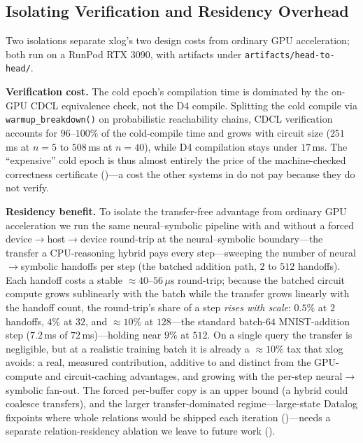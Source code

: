 \subsection{Isolating Verification and Residency Overhead}\label{sec:overhead}

Two isolations separate xlog's two design costs from ordinary GPU acceleration; both run on a RunPod RTX 3090, with artifacts under \texttt{artifacts/head-to-head/}.

\textbf{Verification cost.} The cold epoch's compilation time is dominated by the on-GPU CDCL equivalence check, not the D4 compile. Splitting the cold compile via \texttt{warmup\_breakdown()} on probabilistic reachability chains, CDCL verification accounts for $96$--$100\%$ of the cold-compile time and grows with circuit size ($251$\,ms at $n{=}5$ to $508$\,ms at $n{=}40$), while D4 compilation stays under $17$\,ms. The ``expensive'' cold epoch is thus almost entirely the price of the machine-checked correctness certificate ()---a cost the other systems in  do not pay because they do not verify.

\textbf{Residency benefit.} To isolate the transfer-free advantage from ordinary GPU acceleration we run the same neural--symbolic pipeline with and without a forced device$\to$host$\to$device round-trip at the neural--symbolic boundary---the transfer a CPU-reasoning hybrid pays every step---sweeping the number of neural$\to$symbolic handoffs per step (the batched addition path, $2$ to $512$ handoffs). Each handoff costs a stable ${\approx}40$--$56\,\mu$s round-trip; because the batched circuit compute grows sublinearly with the batch while the transfer grows linearly with the handoff count, the round-trip's share of a step \emph{rises with scale}: $0.5\%$ at $2$ handoffs, $4\%$ at $32$, and ${\approx}10\%$ at $128$---the standard batch-$64$ MNIST-addition step ($7.2$\,ms of $72$\,ms)---holding near $9\%$ at $512$. On a single query the transfer is negligible, but at a realistic training batch it is already a ${\approx}10\%$ tax that xlog avoids: a real, measured contribution, additive to and distinct from the GPU-compute and circuit-caching advantages, and growing with the per-step neural$\to$symbolic fan-out. The forced per-buffer copy is an upper bound (a hybrid could coalesce transfers), and the larger transfer-dominated regime---large-state Datalog fixpoints where whole relations would be shipped each iteration ()---needs a separate relation-residency ablation we leave to future work ().

